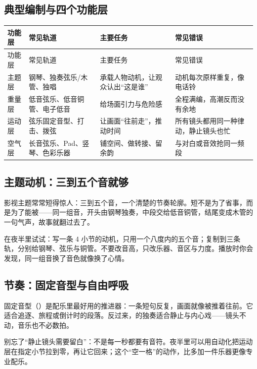 \subsection{典型编制与四个功能层}
\label{sec:film-instrumentation}

\begin{longtable}{p{}p{}p{}p{}}
\toprule
功能层 & 常见轨道 & 主要任务 & 常见错误 \\
\midrule
\endfirsthead
\toprule
功能层 & 常见轨道 & 主要任务 & 常见错误 \\
\midrule
\endhead
主题层 & 钢琴、独奏弦乐/木管、独唱 & 承载人物动机，让观众认出“这是谁” & 动机每次原样重复，像电话铃 \\
重量层 & 低音弦乐、低音铜管、电子低音 & 给场面引力与危险感 & 全程满编，高潮反而没有余地 \\
运动层 & 弦乐固定音型、打击、拨弦 & 让画面“往前走”，推动时间 & 所有镜头都用同一种律动，静止镜头也忙 \\
空气层 & 长音弦乐、Pad、竖琴、色彩乐器 & 铺空间、做转接、留余韵 & 与对白或音效抢同一频段 \\
\bottomrule
\end{longtable}

\subsection{主题动机：三到五个音就够}
\label{sec:film-motif}

影视主题常常短得惊人：三到五个音，一个清楚的节奏轮廓。短不是为了省事，而是为了能被——同一组音，开头由钢琴独奏，中段交给低音铜管，结尾变成木管的一句气声，故事就翻过去了。

在夜半里试试：写一条 4 小节的动机，只用一个八度内的五个音；复制到三条轨，分别给钢琴、弦乐与铜管。不要改音高，只改乐器、音区与力度。播放时你会发现，同一组音换了音色就像换了心情。

\subsection{节奏：固定音型与自由呼吸}
\label{sec:film-rhythm}

固定音型（）是配乐里最好用的推进器：一条短句反复，画面就像被推着往前。它适合追逐、旅程或倒计时的段落。反过来，的独奏适合静止与内心戏——镜头不动，音乐也不必数拍。

别忘了“静止镜头需要留白”：不是每一秒都要有音符。夜半里可以用自动化把运动层在指定小节拉到零，再让它回来；这个“空一格”的动作，比多加一件乐器更像专业配乐。

